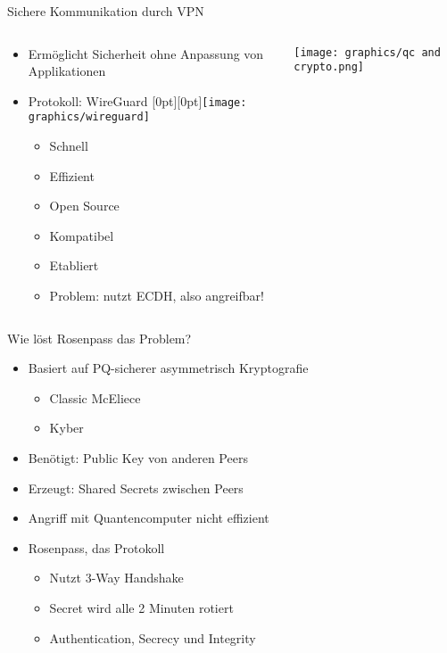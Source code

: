 \documentclass{rosenpass-beamer}
\begin{document}
\begin{frame}{Sichere Kommunikation durch VPN}
\begin{columns}[T]
\begin{column}{0.5\textwidth}
\begin{itemize}
\item  Ermöglicht Sicherheit ohne Anpassung von Applikationen
\item  Protokoll: WireGuard \raisebox{\dimexpr-.5\height+.5\ht\strutbox}[0pt][0pt]{\texttt{[image: graphics/wireguard]}}

  \begin{itemize}
    \item Schnell
  \item Effizient
  \item Open Source
  \item Kompatibel
  \item Etabliert
  \item Problem: nutzt ECDH, also angreifbar!
  \end{itemize}
\end{itemize}
\end{column}

\begin{column}{0.4\textwidth}
\texttt{[image: graphics/qc and crypto.png]}


\end{column}
\end{columns}
\end{frame}

\begin{frame}{Wie löst Rosenpass das Problem?}
\begin{itemize}
\item  Basiert auf PQ-sicherer asymmetrisch Kryptografie

  \begin{itemize}
  \item Classic McEliece
  \item Kyber
  \end{itemize}
\item  Benötigt: Public Key von anderen Peers
\item  Erzeugt: Shared Secrets zwischen Peers
\item  Angriff mit Quantencomputer nicht effizient
\item  Rosenpass, das Protokoll

  \begin{itemize}
    \item Nutzt 3-Way Handshake
  \item Secret wird alle 2 Minuten rotiert
  \item Authentication, Secrecy und Integrity
  \end{itemize}
\end{itemize}
\end{frame}
\end{document}
